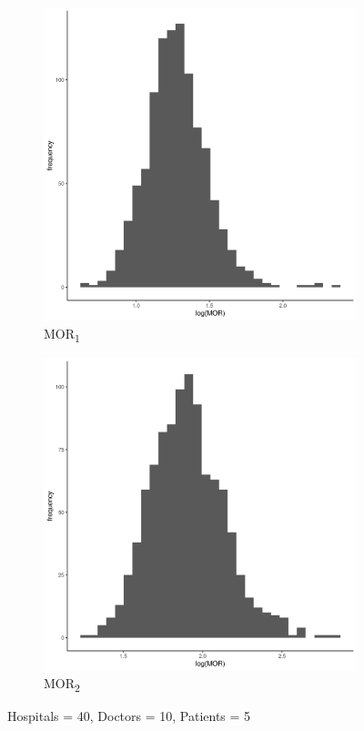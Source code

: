 \documentclass[
  letterpaper,
  DIV=11,
  numbers=noendperiod,
  titlepage]{scrartcl}
\begin{document}
\vspace{10mm}

\begin{figure}
\centering
\begin{subfigure}{.49\textwidth}
    \centering
    \includegraphics[width=.95\linewidth]{../../plots/three-lvl-ran-int/low-prev/hist_40_10_5_three_lvl_low_prev_mor1.png}  
    \caption{MOR\textsubscript{1}}
    \label{l40m10n51}
\end{subfigure}
\begin{subfigure}{.49\textwidth}
    \centering
    \includegraphics[width=.95\linewidth]{../../plots/three-lvl-ran-int/low-prev/hist_40_10_5_three_lvl_low_prev_mor2.png}
    \caption{MOR\textsubscript{2}}
    \label{l40m10n52}
\end{subfigure}
\caption{Hospitals = 40, Doctors = 10, Patients = 5}
\label{mor2}
\end{figure}
\end{document}
